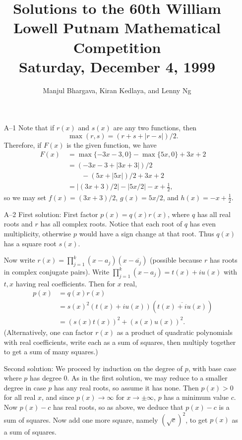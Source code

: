 \documentclass[amssymb,twocolumn,pra,10pt,aps]{revtex4-1}
\begin{document}
\title{Solutions to the 60th William Lowell Putnam Mathematical Competition \\
    Saturday, December 4, 1999}
\author{Manjul Bhargava, Kiran Kedlaya, and Lenny Ng}
\noaffiliation
\maketitle

\begin{itemize}

\item[A--1]
Note that if $r(x)$ and $s(x)$ are any two functions, then
\[ \max(r,s) = (r+s + |r-s|)/2.\]
Therefore, if $F(x)$ is the given function, we have
\begin{align*}
F(x)\ &= \max\{-3x-3,0\}-\max\{5x,0\}+3x+2 \\
      &= (-3x-3+|3x+3|)/2 \\
      & \qquad - (5x + |5x|)/2 + 3x+2 \\
      &= |(3x+3)/2| - |5x/2| -x + \frac{1}{2},
\end{align*}
so we may set $f(x)=(3x+3)/2$, $g(x) = 5x/2$, and $h(x)=-x+\frac{1}{2}$.

\item[A--2]
First solution:
First factor $p(x) = q(x) r(x)$, where $q$ has all real roots and $r$ has
all complex roots. Notice that each root of $q$ has even
multiplicity, otherwise $p$ would have a sign change at that root.
Thus $q(x)$ has a square root $s(x)$.

Now write $r(x) = \prod_{j=1}^k (x - a_j)(x - \overline{a_j})$
(possible because $r$ has roots in complex conjugate pairs).
Write $\prod_{j=1}^k (x - a_j) = t(x) + i u(x)$ with $t,x$
having real coefficients. Then for $x$ real,
\begin{align*}
p(x) &= q(x) r(x) \\
&= s(x)^2 (t(x) + iu(x)) (\overline{t(x) + iu(x)}) \\
&= (s(x)t(x))^2 + (s(x)u(x))^2.
\end{align*}
(Alternatively, one can factor $r(x)$ as a product of quadratic
polynomials with real coefficients, write each as a sum of squares, then
multiply together to get a sum of many squares.)

Second solution:
We proceed by induction on the degree of $p$, with base case where $p$
has degree 0. As in the first solution, we may reduce to a smaller degree
in case $p$ has any real roots, so assume it has none. Then $p(x) > 0$
for all real $x$, and since $p(x) \to \infty$ for $x \to \pm \infty$, $p$
has a minimum value $c$. Now $p(x) - c$ has real roots, so as above, we
deduce that $p(x) - c$ is a sum of squares. Now add one more square,
namely $(\sqrt{c})^2$, to get $p(x)$ as a sum of squares.


\end{itemize}
\end{document}
